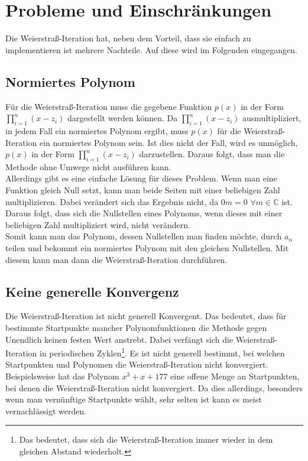 \documentclass[12pt]{article}
\begin{document}
\section{Probleme und Einschränkungen}
Die Weierstraß-Iteration hat, neben dem Vorteil, dass sie einfach zu implementieren ist mehrere Nachteile. Auf diese wird im Folgenden eingegangen.
\subsection{Normiertes Polynom}
Für die Weierstraß-Iteration muss die gegebene Funktion $p(x)$ in der Form $\prod_{i=1}^n (x-z_i)$ dargestellt werden können. Da $\prod_{i=1}^n (x-z_i)$ ausmultipliziert, in jedem Fall ein normiertes Polynom ergibt, muss $p(x)$ für die Weierstraß-Iteration ein normiertes Polynom sein.
Ist dies nicht der Fall, wird es unmöglich, $p(x)$ in der Form $\prod_{i=1}^n (x-z_i)$ darzustellen. Daraus folgt, dass man die Methode ohne Umwege nicht ausführen kann. \\
Allerdings gibt es eine einfache Lösung für dieses Problem. Wenn man eine Funktion gleich Null setzt, kann man beide Seiten mit einer beliebigen Zahl multiplizieren. Dabei verändert sich das Ergebnis nicht, da $0m = 0$ \space $\forall m \in \mathbb{C}$ ist. Daraus folgt, dass sich die Nullstellen eines Polynoms, wenn dieses mit einer beliebigen Zahl multipliziert wird, nicht verändern. \\
Somit kann man das Polynom, dessen Nullstellen man finden möchte, durch $a_n$ teilen und bekommt ein normiertes Polynom mit den gleichen Nullstellen. Mit diesem kann man dann die Weierstraß-Iteration durchführen.

\subsection{Keine generelle Konvergenz}
Die Weierstraß-Iteration ist nicht generell Konvergent. Das bedeutet, dass für bestimmte Startpunkte mancher Polynomfunktionen die Methode gegen Unendlich keinen festen Wert anstrebt. Dabei verfängt sich die Weierstraß-Iteration in periodischen Zyklen\footnote{Das bedeutet, dass sich die Weierstraß-Iteration immer wieder in dem gleichen Abstand wiederholt.}. Es ist nicht generell bestimmt, bei welchen Startpunkten und Polynomen die Weierstraß-Iteration nicht konvergiert. Beispielsweise hat das Polynom $x^3+x+177$ eine offene Menge an Startpunkten, bei denen die Weierstraß-Iteration nicht konvergiert. Da dies allerdings, besonders wenn man vernünftige Startpunkte wählt, sehr selten ist kann es meist vernachlässigt werden. 
\end{document}
